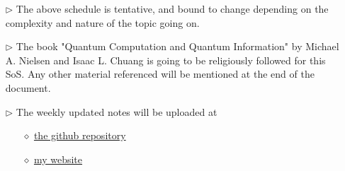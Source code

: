\documentclass{package/notes}
\begin{document}
\vspace{5mm}
\begin{shaded}
\begin{itemize}
\item[$\rhd$] The above schedule is tentative, and bound to change depending on the complexity and nature of the topic going on.
    \item[$\rhd$] The book "Quantum Computation and Quantum Information" by Michael A. Nielsen and Isaac L. Chuang is going to be religiously followed for this SoS. Any other material referenced will be mentioned at the end of the document.
    \item[$\rhd$] The weekly updated notes will be uploaded at
    \begin{itemize}
        \item[$\diamond$] \href{https://github.com/EeshaanJain/Quantum-Computing}{the github repository}
        \item[$\diamond$]
        \href{https://eeshaanjain.github.io/quantum}{my website}
    \end{itemize}
\end{itemize}

\end{shaded}
\newpage


\end{document}
